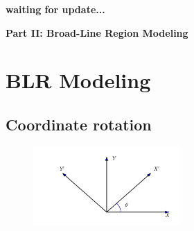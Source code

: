 \documentclass[oneside]{book}
\begin{document}
{\bf waiting for update...}

\clearpage
\newpage

\vspace*{10cm}
{\Huge\centerline{\bf Part II: Broad-Line Region Modeling}}

\setcounter{chapter}{0}
\chapter{BLR Modeling}

\section{Coordinate rotation}
\begin{figure}[h!]
\centering
\includegraphics[width=0.5\textwidth]{coord.pdf}
\end{figure}
\end{document}
